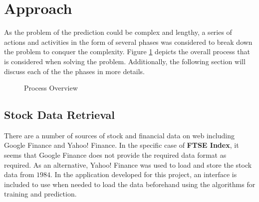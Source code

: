 \documentclass{acm_proc_article-sp}
\begin{document}
\section{Approach} \label{sec:approach}
As the problem of the prediction could be complex and lengthy, a series of actions and activities in the form of
several phases was considered to break down the problem to conquer the complexity. Figure \ref{fig:appoverview}
depicts the overall process that is considered when solving the problem. Additionally, the following section will
discuss each of the the phases in more details.

\begin{figure}[h]
\centering
\setlength\fboxsep{0.1pt}
\setlength\fboxrule{0.7pt}
\caption{Process Overview} \label{fig:appoverview}
\end{figure}


\subsection{Stock Data Retrieval} \label{sec:data}
There are a number of sources of stock and financial data on web including Google Finance and Yahoo! Finance. In the
specific case of \textbf{FTSE Index}, it seems that Google Finance does not provide the required data format as
required. As an alternative, Yahoo! Finance was used to load and store the stock data from $1984$. In the application
developed for this project, an interface is included to use when needed to load the data beforehand using the
algorithms for training and prediction.
\end{document}
